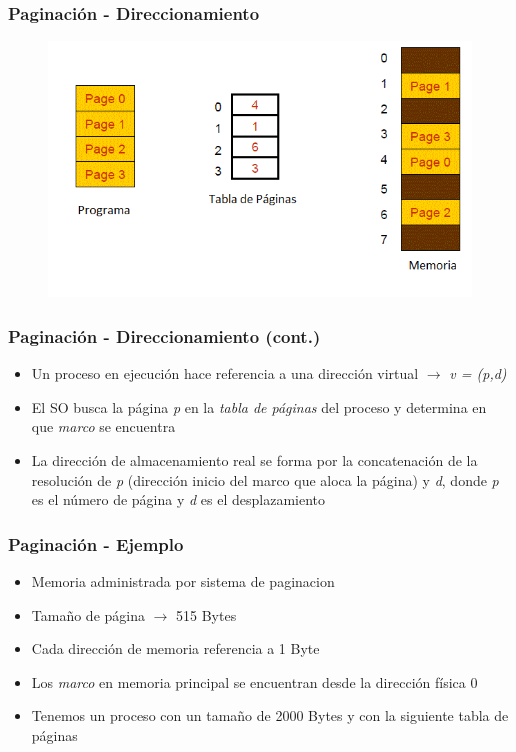 \begin{frame}
  \frametitle{Paginación - \textbf{Direccionamiento}}
  \begin{figure}
    \includegraphics[scale=0.5]{images/pagination1.png}
  \end{figure}
\end{frame}

\begin{frame}
  \frametitle{Paginación - \textbf{Direccionamiento} (cont.)}
  \begin{itemize}
  	  \item Un proceso en ejecución hace referencia a una dirección virtual $\rightarrow$ \emph{v = (p,d)}
	  \item El SO busca la página \emph{p} en la \emph{tabla de páginas} del proceso y determina en que \emph{marco} se encuentra
	  \item La dirección de almacenamiento real se forma por la concatenación de la resolución de \emph{p} (dirección inicio del marco que aloca la página) y \emph{d}, donde \emph{p} es el número de página y \emph{d} es el desplazamiento
  \end{itemize}
\end{frame}

\begin{frame}
  \frametitle{Paginación - Ejemplo}
  \begin{itemize}
  	  \item Memoria administrada por sistema de paginacion
	  \item Tamaño de página $\rightarrow$ 515 Bytes
	  \item Cada dirección de memoria referencia a 1 Byte
	  \item Los \emph{marco} en memoria principal se encuentran desde la dirección física 0
	  \item Tenemos un proceso con un tamaño de 2000 Bytes y con la siguiente tabla de páginas
  \end{itemize}
\end{frame}


